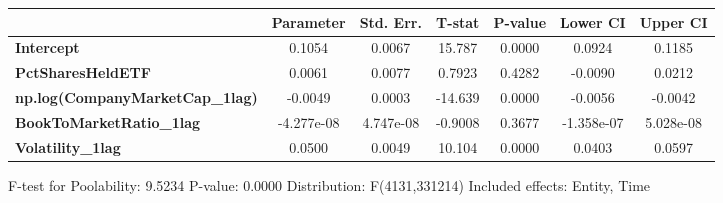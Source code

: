 \begin{center}
\begin{tabular}{lclc}
\bottomrule
\end{tabular}
\begin{tabular}{lcccccc}
                                        & \textbf{Parameter} & \textbf{Std. Err.} & \textbf{T-stat} & \textbf{P-value} & \textbf{Lower CI} & \textbf{Upper CI}  \\
\midrule
\textbf{Intercept}                      &       0.1054       &       0.0067       &      15.787     &      0.0000      &       0.0924      &       0.1185       \\
\textbf{PctSharesHeldETF}               &       0.0061       &       0.0077       &      0.7923     &      0.4282      &      -0.0090      &       0.0212       \\
\textbf{np.log(CompanyMarketCap\_1lag)} &      -0.0049       &       0.0003       &     -14.639     &      0.0000      &      -0.0056      &      -0.0042       \\
\textbf{BookToMarketRatio\_1lag}        &     -4.277e-08     &     4.747e-08      &     -0.9008     &      0.3677      &     -1.358e-07    &     5.028e-08      \\
\textbf{Volatility\_1lag}               &       0.0500       &       0.0049       &      10.104     &      0.0000      &       0.0403      &       0.0597       \\
\bottomrule
\end{tabular}
\end{center}

F-test for Poolability: 9.5234 \newline
 P-value: 0.0000 \newline
 Distribution: F(4131,331214) \newline
  \newline
 Included effects: Entity, Time